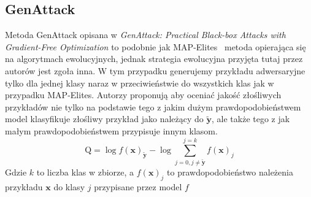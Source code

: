 \documentclass[
    left=2.5cm,         %
    right=2.5cm,        %
    top=2.5cm,          %
    bottom=3cm,         %
    bindingoffset=6mm,  %
    nohyphenation=false %
]{eiti/eiti-thesis}
\renewcommand{\vec}[1]{\mathbf{#1}}
\begin{document}
\subsection{GenAttack}
Metoda GenAttack opisana w \textit{GenAttack: Practical Black-box Attacks with Gradient-Free Optimization}\cite{DBLP:journals/corr/abs-1805-11090}
to podobnie jak MAP-Elites~\cite{DBLP:journals/corr/NguyenYC14} metoda opierająca się na algorytmach ewolucyjnych, jednak strategia ewolucyjna
przyjęta tutaj przez autorów jest zgoła inna. W tym przypadku generujemy przykładu adwersaryjne tylko dla jednej klasy naraz
w przeciwieństwie do wszystkich klas jak w przypadku MAP-Elites.
Autorzy proponują aby oceniać jakość złośliwych przykładów nie tylko na podstawie tego z jakim dużym prawdopodobieństwem
model klasyfikuje złośliwy przykład jako należący do \(\vec{\widetilde{y}}\), ale także tego z jak małym prawdopodobieństwem przypisuje innym klasom.
\begin{equation}
    \text{Q} = \log{f(\vec{x})}_{\vec{\widetilde{y}}} - \log\sum^{j=k}_{j=0,j\neq \vec{\widetilde{y}}} f(\vec{x})_j
\end{equation}
Gdzie \(k\) to liczba klas w zbiorze, a \(f(\vec{x})_j\) to prawdopodobieństwo należenia przykładu \(\vec{x}\) do klasy \(j\) przypisane przez model \(f\)
\end{document}
